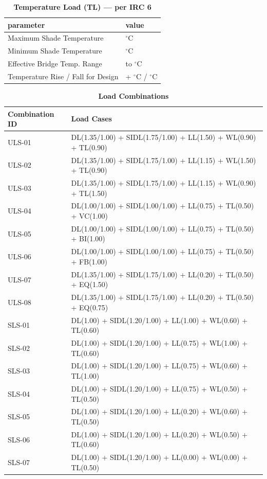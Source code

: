 \documentclass[12pt,a4paper]{report}
\numberwithin{table}{chapter}
\numberwithin{figure}{chapter}
\begin{document}
\vspace{1em}
\begin{longtable}{|L{5.5cm}|p{10.0cm}|}
\caption{\textbf{Temperature Load (TL) --- per IRC 6}}\\
\hline
\textbf{parameter} & \textbf{value} \\
\hline
\textnormal{Maximum Shade Temperature} &  $^\circ$C \\[6pt]
\hline
\textnormal{Minimum Shade Temperature} &  $^\circ$C \\[6pt]
\hline
\textnormal{Effective Bridge Temp. Range} &  to  $^\circ$C \\[6pt]
\hline
\textnormal{Temperature Rise / Fall for Design} & + $^\circ$C / \textminus{} $^\circ$C \\[6pt]
\hline
\end{longtable}

\vspace{1em}
\begin{longtable}{|C{4.0cm}|p{11.5cm}|}
\caption{\textbf{Load Combinations}}\\
\hline
\textbf{Combination ID} & \textbf{Load Cases} \\[6pt]
\hline
ULS-01 & DL(1.35/1.00) + SIDL(1.75/1.00) + LL(1.50) + WL(0.90) + TL(0.90) \\[6pt]
\hline
ULS-02 & DL(1.35/1.00) + SIDL(1.75/1.00) + LL(1.15) + WL(1.50) + TL(0.90) \\[6pt]
\hline
ULS-03 & DL(1.35/1.00) + SIDL(1.75/1.00) + LL(1.15) + WL(0.90) + TL(1.50) \\[6pt]
\hline
ULS-04 & DL(1.00/1.00) + SIDL(1.00/1.00) + LL(0.75) + TL(0.50) + VC(1.00) \\[6pt]
\hline
ULS-05 & DL(1.00/1.00) + SIDL(1.00/1.00) + LL(0.75) + TL(0.50) + BI(1.00) \\[6pt]
\hline
ULS-06 & DL(1.00/1.00) + SIDL(1.00/1.00) + LL(0.75) + TL(0.50) + FB(1.00) \\[6pt]
\hline
ULS-07 & DL(1.35/1.00) + SIDL(1.75/1.00) + LL(0.20) + TL(0.50) + EQ(1.50) \\[6pt]
\hline
ULS-08 & DL(1.35/1.00) + SIDL(1.75/1.00) + LL(0.20) + TL(0.50) + EQ(0.75) \\[6pt]
\hline
SLS-01 & DL(1.00) + SIDL(1.20/1.00) + LL(1.00) + WL(0.60) + TL(0.60) \\[6pt]
\hline
SLS-02 & DL(1.00) + SIDL(1.20/1.00) + LL(0.75) + WL(1.00) + TL(0.60) \\[6pt]
\hline
SLS-03 & DL(1.00) + SIDL(1.20/1.00) + LL(0.75) + WL(0.60) + TL(1.00) \\[6pt]
\hline
SLS-04 & DL(1.00) + SIDL(1.20/1.00) + LL(0.75) + WL(0.50) + TL(0.50) \\[6pt]
\hline
SLS-05 & DL(1.00) + SIDL(1.20/1.00) + LL(0.20) + WL(0.60) + TL(0.50) \\[6pt]
\hline
SLS-06 & DL(1.00) + SIDL(1.20/1.00) + LL(0.20) + WL(0.50) + TL(0.60) \\[6pt]
\hline
SLS-07 & DL(1.00) + SIDL(1.20/1.00) + LL(0.00) + WL(0.00) + TL(0.50) \\[6pt]
\hline
\end{longtable}
\end{document}
